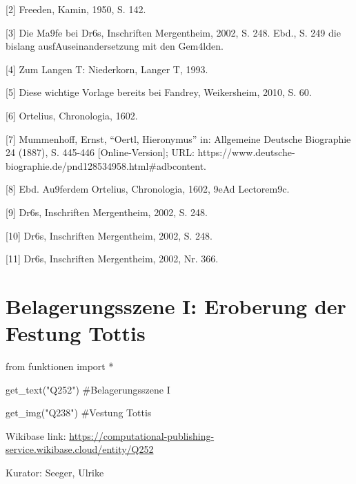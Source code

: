 \documentclass[
  a4paper,
  portrait]{book}
\newenvironment{Shaded}{\begin{snugshade}}{\end{snugshade}}
\newcommand{\CommentTok}[1]{\textcolor[rgb]{0.37,0.37,0.37}{#1}}
\newcommand{\ImportTok}[1]{\textcolor[rgb]{0.00,0.46,0.62}{#1}}
\newcommand{\NormalTok}[1]{\textcolor[rgb]{0.00,0.23,0.31}{#1}}
\newcommand{\OperatorTok}[1]{\textcolor[rgb]{0.37,0.37,0.37}{#1}}
\newcommand{\StringTok}[1]{\textcolor[rgb]{0.13,0.47,0.30}{#1}}
\begin{document}
{[}2{]} Freeden, Kamin, 1950, S. 142.

{[}3{]} Die Ma\x9fe bei Dr\xb6s, Inschriften Mergentheim, 2002,
S. 248. Ebd., S. 249 die bislang
ausf\xbchrlichste Auseinandersetzung mit den Gem\xa4lden.

{[}4{]} Zum Langen T\xbcrkenkrieg: Niederkorn, Langer
T\xbcrkenkrieg, 1993.

{[}5{]} Diese wichtige Vorlage bereits bei Fandrey, Weikersheim, 2010,
S. 60.

{[}6{]} Ortelius, Chronologia, 1602.

{[}7{]} Mummenhoff, Ernst, ``Oertl, Hieronymus'' in: Allgemeine Deutsche
Biographie 24 (1887), S. 445-446 {[}Online-Version{]}; URL:
https://www.deutsche-biographie.de/pnd128534958.html\#adbcontent.

{[}8{]} Ebd. Au\x9ferdem Ortelius, Chronologia, 1602, \x9eAd
Lectorem\x9c.

{[}9{]} Dr\xb6s, Inschriften Mergentheim, 2002, S.
248.

{[}10{]} Dr\xb6s, Inschriften Mergentheim, 2002, S.
248.

{[}11{]} Dr\xb6s, Inschriften Mergentheim, 2002, Nr. 366.

\chapter{Belagerungsszene I: Eroberung der Festung
Tottis}\label{belagerungsszene-i-eroberung-der-festung-tottis}

\begin{Shaded}
\begin{Highlighting}[]
\ImportTok{from}\NormalTok{ funktionen }\ImportTok{import} \OperatorTok{*}
\end{Highlighting}
\end{Shaded}

\begin{Shaded}
\begin{Highlighting}[]
\NormalTok{get\_text(}\StringTok{"Q252"}\NormalTok{)}
\CommentTok{\#Belagerungsszene I}

\NormalTok{get\_img(}\StringTok{"Q238"}\NormalTok{)}
\CommentTok{\#Vestung Tottis}
\end{Highlighting}
\end{Shaded}

Wikibase link:
\url{https://computational-publishing-service.wikibase.cloud/entity/Q252}

Kurator: Seeger, Ulrike
\end{document}
